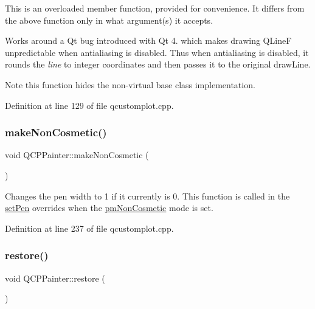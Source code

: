 This is an overloaded member function, provided for convenience. It differs from the above function only in what argument(s) it accepts.

Works around a Qt bug introduced with Qt 4. which makes drawing Q\+LineF unpredictable when antialiasing is disabled. Thus when antialiasing is disabled, it rounds the {\itshape line} to integer coordinates and then passes it to the original draw\+Line.

\begin{DoxyNote}{Note}
this function hides the non-\/virtual base class implementation. 
\end{DoxyNote}


Definition at line 129 of file qcustomplot.\+cpp.

\mbox{\label{class_q_c_p_painter_a7e63fbcf47e35c6f2ecd11b8fef7c7d8}} 
\subsubsection{\texorpdfstring{make\+Non\+Cosmetic()}{makeNonCosmetic()}}
{\footnotesize\ttfamily void Q\+C\+P\+Painter\+::make\+Non\+Cosmetic (\begin{DoxyParamCaption}{ }\end{DoxyParamCaption})}

Changes the pen width to 1 if it currently is 0. This function is called in the \hyperlink{class_q_c_p_painter_af9c7a4cd1791403901f8c5b82a150195}{set\+Pen} overrides when the \hyperlink{class_q_c_p_painter_a156cf16444ff5e0d81a73c615fdb156dac1e481bfaf408f2bd2eaad3ec341f36b}{pm\+Non\+Cosmetic} mode is set. 

Definition at line 237 of file qcustomplot.\+cpp.

\mbox{\label{class_q_c_p_painter_a64908e6298d5bbd83457dc987cc3a022}} 
\subsubsection{\texorpdfstring{restore()}{restore()}}
{\footnotesize\ttfamily void Q\+C\+P\+Painter\+::restore (\begin{DoxyParamCaption}{ }\end{DoxyParamCaption})}

